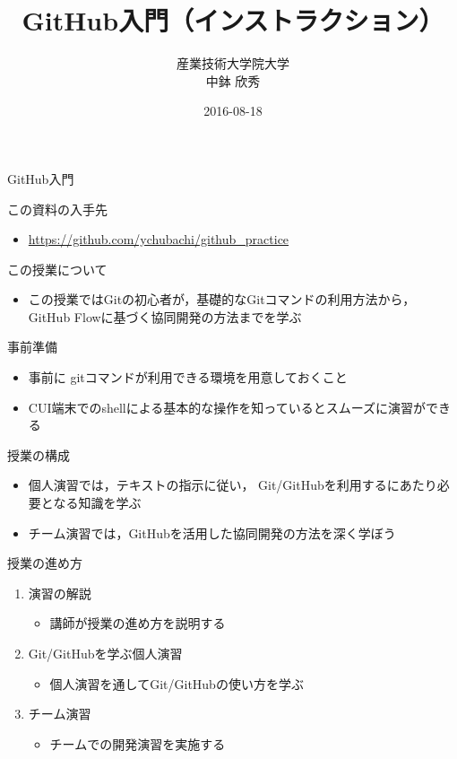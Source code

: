 \documentclass[a4paper,twoside,twocolumn]{beamer}
\author{産業技術大学院大学\\ 中鉢 欣秀}
\date{2016-08-18}
\title{GitHub入門（インストラクション）}
\begin{document}
\maketitle

\begin{frame}[label=sec-1]{GitHub入門}
\begin{block}{この資料の入手先}
\begin{itemize}
\item \url{https://github.com/ychubachi/github_practice}
\end{itemize}
\end{block}

\begin{block}{この授業について}
\begin{itemize}
\item この授業ではGitの初心者が，基礎的なGitコマンドの利用方法から，
GitHub Flowに基づく協同開発の方法までを学ぶ
\end{itemize}
\end{block}

\begin{block}{事前準備}
\begin{itemize}
\item 事前に gitコマンドが利用できる環境を用意しておくこと
\item CUI端末でのshellによる基本的な操作を知っているとスムーズに演習ができる
\end{itemize}
\end{block}

\begin{block}{授業の構成}
\begin{itemize}
\item 個人演習では，テキストの指示に従い，
Git/GitHubを利用するにあたり必要となる知識を学ぶ
\item チーム演習では，GitHubを活用した協同開発の方法を深く学ぼう
\end{itemize}
\end{block}

\begin{block}{授業の進め方}
\begin{enumerate}
\item 演習の解説
\begin{itemize}
\item 講師が授業の進め方を説明する
\end{itemize}
\item Git/GitHubを学ぶ個人演習
\begin{itemize}
\item 個人演習を通してGit/GitHubの使い方を学ぶ
\end{itemize}
\item チーム演習
\begin{itemize}
\item チームでの開発演習を実施する
\end{itemize}
\end{enumerate}
\end{block}
\end{frame}
\end{document}
